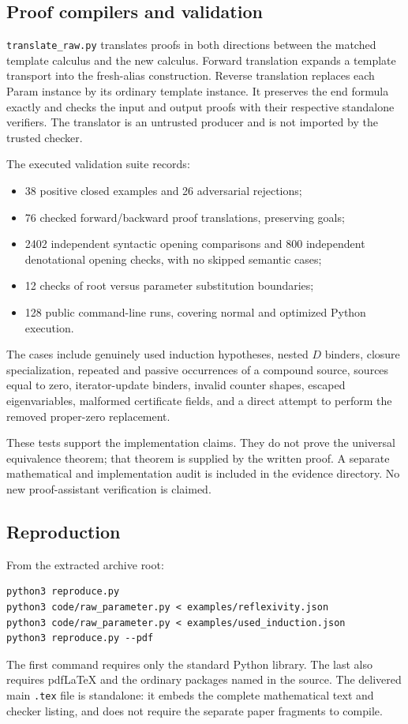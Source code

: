 \subsection{Proof compilers and validation}

\texttt{translate\_raw.py} translates proofs in both directions between
the matched template calculus and the new calculus. Forward translation
expands a template transport into the fresh-alias construction. Reverse
translation replaces each Param instance by its ordinary template
instance. It preserves the end formula exactly and checks the input and
output proofs with their respective standalone verifiers. The translator
is an untrusted producer and is not imported by the trusted checker.

The executed validation suite records:
\begin{itemize}
\item 38 positive closed examples and 26 adversarial rejections;
\item 76 checked forward/backward proof translations, preserving goals;
\item 2402 independent syntactic opening comparisons and 800 independent
      denotational opening checks, with no skipped semantic cases;
\item 12 checks of root versus parameter substitution boundaries;
\item 128 public command-line runs, covering normal and optimized
      Python execution.
\end{itemize}
The cases include genuinely used induction hypotheses, nested $D$
binders, closure specialization, repeated and passive occurrences of a
compound source, sources equal to zero, iterator-update binders, invalid
counter shapes, escaped eigenvariables, malformed certificate fields,
and a direct attempt to perform the removed proper-zero replacement.

These tests support the implementation claims. They do not prove the
universal equivalence theorem; that theorem is supplied by the written
proof. A separate mathematical and implementation audit is included in
the evidence directory. No new proof-assistant verification is claimed.

\subsection{Reproduction}

From the extracted archive root:
\begin{lstlisting}[language={}]
python3 reproduce.py
python3 code/raw_parameter.py < examples/reflexivity.json
python3 code/raw_parameter.py < examples/used_induction.json
python3 reproduce.py --pdf
\end{lstlisting}
The first command requires only the standard Python library. The last
also requires pdfLaTeX and the ordinary packages named in the source.
The delivered main \texttt{.tex} file is standalone: it embeds the complete
mathematical text and checker listing, and does not require the separate
paper fragments to compile.

